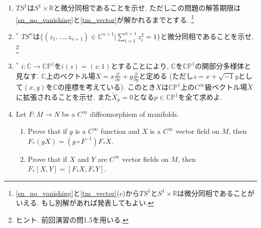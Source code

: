 \documentclass[dvipdfmx,a4paper,11pt]{article}
\newcommand{\R}{\mathbb{R}}
\newcommand{\C}{\mathbb{C}}
\theoremstyle{definition}
\newcommand{\pdrv}[2]{\frac{\partial #1}{\partial #2}}
\begin{document}
\begin{enumerate}[label=\textbf{問}2.\arabic*]
\item $TS^1$は$S^1 \times \R$と微分同相であることを示せ. ただしこの問題の解答期限は\ref{sn_no_vanishing}と\ref{tm_vector}が解かれるまでとする. \footnote{\ref{sn_no_vanishing}と\ref{tm_vector}(c)から$TS^1 $と$S^{1} \times \R $は微分同相であることがいえる. もし別解があれば発表してもよい.}

\item $^{*}$  $TS^n$は$\{ (z_1, \ldots,z_{n+1}) \in \C^{n+1} | \sum_{i=1}^{n+1} z_{i}^{2} =1\}$と微分同相であることを示せ. \footnote{ヒント. 前回演習の問1.5を用いる.}


\item $^{*}$  $i : \C \rightarrow \C\mathbb{P}^{1}$を$i(z) = (z:1)$とすることにより, $\C$を$\C\mathbb{P}^{1}$の開部分多様体と見なす.  
$\C $上のベクトル場$X = x \pdrv{}{x} + y \pdrv{}{y}$と定める (ただし$z = x + \sqrt{-1} y$として$(x,y)$を$\C$の座標を考えている).
このとき$X$は$\C \mathbb{P}^{1}$上の$C^{\infty}$級ベクトル場$\tilde{X}$に拡張されることを示せ. また$\tilde{X}_{p}=0$となる$p \in \C \mathbb{P}^{1}$を全て求めよ. 

\item Let $F : M \rightarrow N$ be a $C^{\infty}$ diffeomorphism of manifolds. 
\begin{enumerate}
\item Prove that if $g$ is a $C^{\infty}$ function and $X$ is a $C^{\infty}$ vector field on $M$, then $F_{*}(gX) = (g \circ F^{-1}) F_{*}X$.
\item Prove that if $X$ and $Y$ are $C^{\infty}$ vector fields on $M$, then $F_{*}[X,Y]=[F_{*}X,F_{*}Y]$.

\end{enumerate}


\vspace{11pt}
\hspace{-33pt}{\large $\bullet$積分曲線の問題}


\end{enumerate}
\end{document}
